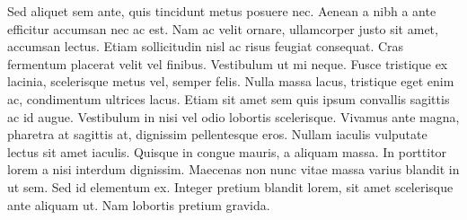 \documentclass[./main_en.tex]{subfiles}
\begin{document}
\par Sed aliquet sem ante, quis tincidunt metus posuere nec. Aenean a nibh a ante efficitur accumsan nec ac est. Nam ac velit ornare, ullamcorper justo sit amet, accumsan lectus. Etiam sollicitudin nisl ac risus feugiat consequat. Cras fermentum placerat velit vel finibus. Vestibulum ut mi neque. Fusce tristique ex lacinia, scelerisque metus vel, semper felis. Nulla massa lacus, tristique eget enim ac, condimentum ultrices lacus. Etiam sit amet sem quis ipsum convallis sagittis ac id augue. Vestibulum in nisi vel odio lobortis scelerisque. Vivamus ante magna, pharetra at sagittis at, dignissim pellentesque eros. Nullam iaculis vulputate lectus sit amet iaculis. Quisque in congue mauris, a aliquam massa. In porttitor lorem a nisi interdum dignissim. Maecenas non nunc vitae massa varius blandit in ut sem. Sed id elementum ex. Integer pretium blandit lorem, sit amet scelerisque ante aliquam ut. Nam lobortis pretium gravida.
\clearpage
\end{document}
